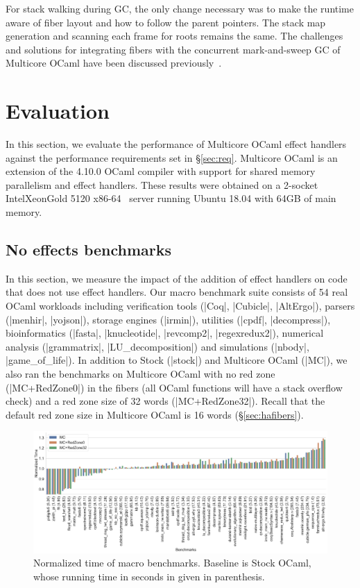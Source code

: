 \documentclass[sigplan,screen]{acmart}
\begin{document}
For stack walking during GC, the only change necessary was to make the
runtime aware of fiber layout and how to follow the parent pointers. The
stack map generation and scanning each frame for roots remains the same. The
challenges and solutions for integrating fibers with the concurrent
mark-and-sweep GC of Multicore OCaml have been discussed
previously~\cite{Sivaramakrishnan20}.

\section{Evaluation}
\label{sec:eval}

In this section, we evaluate the performance of Multicore OCaml effect handlers
against the performance requirements set in \S\ref{sec:req}. Multicore OCaml is
an extension of the 4.10.0 OCaml compiler with support for shared memory
parallelism and effect handlers. These results were obtained on a 2-socket
Intel\textregistered Xeon\textregistered Gold 5120
x86-64~\cite{IntelXeonGold5120Spec} server running Ubuntu 18.04 with 64GB of main
memory.

\subsection{No effects benchmarks}

In this section, we measure the impact of the addition of effect handlers on
code that does not use effect handlers. Our macro benchmark suite consists of
54 real OCaml workloads including verification tools (|Coq|, |Cubicle|,
|AltErgo|), parsers (|menhir|, |yojson|), storage engines (|irmin|), utilities
(|cpdf|, |decompress|), bioinformatics (|fasta|, |knucleotide|, |revcomp2|,
|regexredux2|), numerical analysis (|grammatrix|, |LU_decomposition|) and
simulations (|nbody|, |game_of_life|). In addition to Stock (|stock|) and
Multicore OCaml (|MC|), we also ran the benchmarks on Multicore OCaml with no
red zone (|MC+RedZone0|) in the fibers (all OCaml functions will have a stack
overflow check) and a red zone size of 32 words (|MC+RedZone32|). Recall that
the default red zone size in Multicore OCaml is 16 words (\S\ref{sec:hafibers}).

\begin{figure}
	\includegraphics[scale=0.35]{sandmark-notebook/sandmark_time}
	\caption{Normalized time of macro benchmarks. Baseline is Stock OCaml,
		whose running time in seconds in given in parenthesis.}
	\label{res:macro_time}
\end{figure}
\end{document}
